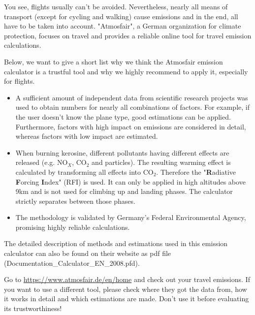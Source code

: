 You see, flights usually can't be avoided. Nevertheless, nearly all means of transport (except for cycling and walking) cause emissions and in the end, all have to be taken into account. 
"Atmosfair", a German organization for climate protection, focuses on travel and provides a reliable online tool for travel emission calculations.


Below, we want to give a short list why we think the Atmosfair emission calculator is a trustful tool and why we highly recommend to apply it, especially for flights. 

\begin{itemize}
	\item A sufficient amount of independent data from scientific research projects was used to obtain numbers for nearly all combinations of factors. For example, if the user doesn't know the plane type, good estimations can be applied. Furthermore, factors with high impact on emissions are considered in detail, whereas factors with low impact are estimated.
	
	\item When burning kerosine, different pollutants having different effects are released (e.g. NO$_X$, CO$_2$ and particles). The resulting warming effect is calculated by transforming all effects into CO$_2$. Therefore the "\textbf{R}adiative \textbf{F}orcing \textbf{I}ndex" (RFI) is used. It can only be applied in high altitudes above 9km and is not used for climbing up and landing phases. The calculator strictly separates between those phases.
	
	\item The methodology is validated by Germany's Federal Environmental Agency, promising highly reliable calculations.
\end{itemize}

The detailed description of methods and estimations used in this emission calculator can also be found on their website as pdf file (Documentation_Calculator_EN_2008.pfd). \cite{flight_calc}

\begin{suggest} {}
	Go to \url{https://www.atmosfair.de/en/home} and check out your travel emissions. If you want to use a different tool, please check where they got the data from, how it works in detail and which estimations are made. Don't use it before evaluating its trustworthiness!
\end{suggest}


